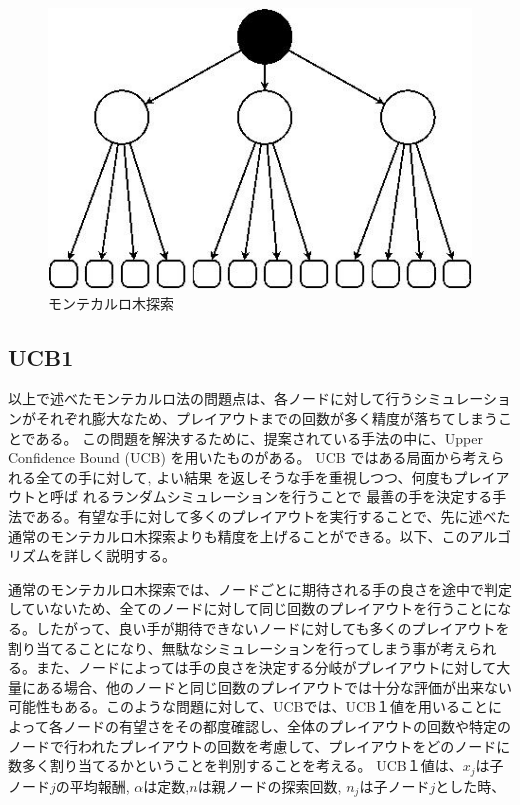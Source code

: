 \begin{figure}[h]
 \centering
 \includegraphics[keepaspectratio, scale=0.5,bb=0 0 283 121]
      {img/monte.jpg}
 \caption{モンテカルロ木探索}
 \label{monte2}
\end{figure}

\subsection{UCB1}
以上で述べたモンテカルロ法の問題点は、各ノードに対して行うシミュレーションがそれぞれ膨大なため、プレイアウトまでの回数が多く精度が落ちてしまうことである。
この問題を解決するために、提案されている手法の中に、Upper Confidence Bound (UCB) \cite{UCB}を用いたものがある。
UCB ではある局面から考えられる全ての手に対して, よい結果 を返しそうな手を重視しつつ、何度もプレイアウトと呼ば れるランダムシミュレーションを行うことで 最善の手を決定する手法である。有望な手に対して多くのプレイアウトを実行することで、先に述べた通常のモンテカルロ木探索よりも精度を上げることができる。以下、このアルゴリズムを詳しく説明する。

通常のモンテカルロ木探索では、ノードごとに期待される手の良さを途中で判定していないため、全てのノードに対して同じ回数のプレイアウトを行うことになる。したがって、良い手が期待できないノードに対しても多くのプレイアウトを割り当てることになり、無駄なシミュレーションを行ってしまう事が考えられる。また、ノードによっては手の良さを決定する分岐がプレイアウトに対して大量にある場合、他のノードと同じ回数のプレイアウトでは十分な評価が出来ない可能性もある。このような問題に対して、UCBでは、UCB１値を用いることによって各ノードの有望さをその都度確認し、全体のプレイアウトの回数や特定のノードで行われたプレイアウトの回数を考慮して、プレイアウトをどのノードに数多く割り当てるかということを判別することを考える。
UCB１値は、${x_{j}}$は子ノード$j$の平均報酬, $α$は定数,$n$は親ノードの探索回数, ${n_{j}}$は子ノード$j$とした時、

